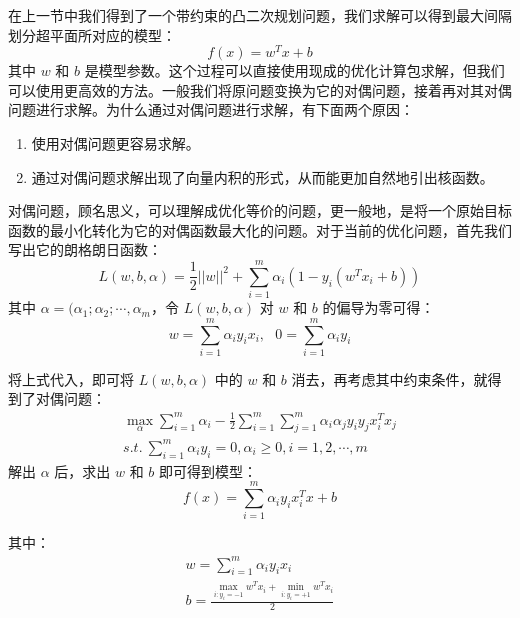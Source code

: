 \documentclass[12pt, a4paper]{article} %
\begin{document}
在上一节中我们得到了一个带约束的凸二次规划问题，我们求解可以得到最大间隔划分超平面所对应的模型：
\begin{equation*}
    f(x) = w^T x + b
\end{equation*}
其中 $w$ 和 $b$ 是模型参数。这个过程可以直接使用现成的优化计算包求解，但我们可以使用更高效的方法。一般我们将原问题变换为它的对偶问题，接着再对其对偶问题进行求解。为什么通过对偶问题进行求解，有下面两个原因：

\begin{enumerate}[\hspace*{2em} i.]
    \item 使用对偶问题更容易求解。
    \item 通过对偶问题求解出现了向量内积的形式，从而能更加自然地引出核函数。
\end{enumerate}

对偶问题，顾名思义，可以理解成优化等价的问题，更一般地，是将一个原始目标函数的最小化转化为它的对偶函数最大化的问题。对于当前的优化问题，首先我们写出它的朗格朗日函数：
\begin{equation*}
    L(w, b, \alpha) = \frac{1}{2} ||w||^2 + \sum_{i = 1}^{m} \alpha_i (1 - y_i(w^T x_i + b))
\end{equation*}
其中 $\alpha = (\alpha_1; \alpha_2; \cdots, \alpha_m$，令 $L(w, b, \alpha)$ 对 $w$ 和 $b$ 的偏导为零可得：
\begin{equation*}
    w = \sum_{i = 1}^{m} \alpha_i y_i x_i, \ \ \ 0 = \sum_{i = 1}^{m} \alpha_i y_i
\end{equation*}

将上式代入，即可将 $L(w, b, \alpha)$ 中的 $w$ 和 $b$ 消去，再考虑其中约束条件，就得到了对偶问题：
\begin{equation*}
    \begin{array}{*{20}{l}}
        \displaystyle \max_{\alpha} \sum_{i = 1}^{m} \alpha_i - \frac{1}{2} \sum_{i = 1}^{m} \sum_{j = 1}^{m} \alpha_i \alpha_j y_i y_j x_i ^T x_j \\
        \displaystyle s.t. \ \sum_{i = 1}^{m} \alpha_i y_i = 0, \alpha_i \ge 0, i = 1, 2, \cdots, m
    \end{array}
\end{equation*}
解出 $\alpha$ 后，求出 $w$ 和 $b$ 即可得到模型：
\begin{equation*}
    f(x) = \sum_{i = 1}^{m} \alpha_i y_i x_i^T x + b
\end{equation*}

其中：
\begin{equation*}
    \begin{array}{*{20}{l}}
        \displaystyle w = \sum_{i = 1}^{m} \alpha_i y_i x_i \\
        \displaystyle b = \frac{
            \displaystyle \max_{i: y_i = -1} w^T x_i + \min_{i: y_i = +1} w^T x_i
        }{2}
    \end{array}
\end{equation*}
\end{document}
